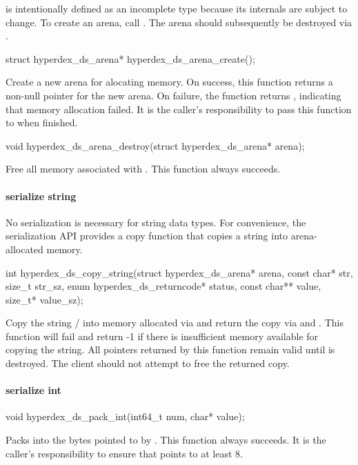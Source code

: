  is intentionally defined as an incomplete type
because its internals are subject to change.  To create an arena, call
.  The arena should subsequently be destroyed
via .

\begin{ccode}
struct hyperdex_ds_arena* hyperdex_ds_arena_create();
\end{ccode}
\funcdesc Create a new arena for alocating memory.  On success, this function
returns a non-null pointer for the new arena.  On failure, the function returns
, indicating that memory allocation failed.  It is the caller's
responsibility to pass this function to  when
finished.

\funcsep
\begin{ccode}
void hyperdex_ds_arena_destroy(struct hyperdex_ds_arena* arena);
\end{ccode}
\funcdesc Free all memory associated with .  This function always
succeeds.

\paragraph{serialize string}

No serialization is necessary for string data types.  For convenience, the
serialization API provides a copy function that copies a string into
arena-allocated memory.

\begin{ccode}
int hyperdex_ds_copy_string(struct hyperdex_ds_arena* arena, const char* str,
                            size_t str_sz, enum hyperdex_ds_returncode* status,
                            const char** value, size_t* value_sz);
\end{ccode}
\funcdesc  Copy the string / into memory allocated via
 and return the copy via  and .  This
function will fail and return -1 if there is insufficient memory available for
copying the string.  All pointers returned by this function remain valid until
 is destroyed.  The client should not attempt to free the returned
copy.

\paragraph{serialize int}

\begin{ccode}
void hyperdex_ds_pack_int(int64_t num, char* value);
\end{ccode}
\funcdesc Packs  into the bytes pointed to by .  This
function always succeeds.  It is the caller's responsibility to ensure that
 points to at least \unit{8}{\byte}.

